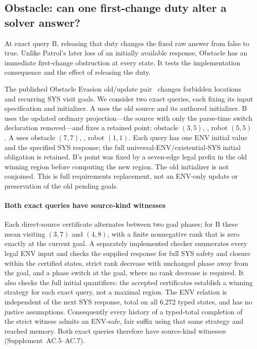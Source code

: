 \subsection{Obstacle: can one first-change duty alter a solver answer?}
At exact query B, releasing that duty changes the fixed raw answer from
false to true. Unlike Patrol's later loss of an initially available response,
Obstacle has an immediate first-change obstruction at every state. It tests
the implementation consequence and the effect of releasing the duty.

The published Obstacle Evasion old/update pair~\cite{dupdate} changes
forbidden locations and recurring SYS visit goals. We consider two exact
queries, each fixing its input specification and initializer. A uses the old source and its authored initializer. B uses the
updated ordinary projection---the source with only the parse-time switch
declaration removed---and fixes a retained point: obstacle $(3,5)$,
, robot $(5,5)$. A uses obstacle $(7,7)$,
, robot $(1,1)$. Each query has one ENV initial value
and the specified SYS response; the full universal-ENV/existential-SYS
initial obligation is retained. B's point was fixed by a seven-edge legal
prefix in the old winning region before computing the new region. The old
initializer is not conjoined. This is full requirements replacement,
not an ENV-only update or preservation of the old pending goals.

\paragraph{Both exact queries have source-kind witnesses}
Each direct-source certificate alternates between two goal phases; for B
these mean visiting $(3,7)$ and $(4,8)$, with a finite nonnegative rank that
is zero exactly at the current goal. A separately implemented checker
enumerates every legal ENV input and checks the supplied response for full
SYS safety and closure within the certified states, strict rank decrease with unchanged phase away from
the goal, and a phase switch at the goal, where no rank decrease is required.
It also checks the full initial quantifiers: the accepted certificates
establish a winning strategy for each exact query, not a maximal region.
The ENV relation is independent of the next SYS response, total on all
6,272 typed states, and has no justice assumptions. Consequently every
history of a typed-total completion of the strict witness admits an ENV-safe,
fair suffix using that same strategy and reached memory. Both exact queries
therefore have source-kind witnesses (Supplement~AC.5--AC.7).

